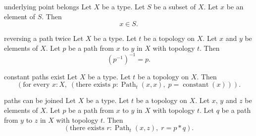 \begin{cleanresult}{underlying point belongs}
Let $X$ be a type.
Let $S$ be a subset of $X$.
Let $x$ be an element of $S$.
Then \[x\in S.\]
\par{}
\end{cleanresult}

\begin{cleanresult}{reversing a path twice}
Let $X$ be a type.
Let $t$ be a topology on $X$.
Let $x$ and $y$ be elements of $X$.
Let $p$ be a path from $x$ to $y$ in $X$ with topology $t$.
Then \[(p^{-1})^{-1}=p.\]
\par{}
\end{cleanresult}

\begin{cleanresult}{constant paths exist}
Let $X$ be a type.
Let $t$ be a topology on $X$.
Then \[\left(\text{for every }x : X,\; \left(\text{there exists }p : \operatorname{Path}_{t}(x,x),\; p=\operatorname{constant}(x)\right)\right).\]
\par{}
\end{cleanresult}

\begin{cleanresult}{paths can be joined}
Let $X$ be a type.
Let $t$ be a topology on $X$.
Let $x$, $y$ and $z$ be elements of $X$.
Let $p$ be a path from $x$ to $y$ in $X$ with topology $t$.
Let $q$ be a path from $y$ to $z$ in $X$ with topology $t$.
Then \[\left(\text{there exists }r : \operatorname{Path}_{t}(x,z),\; r=p * q\right).\]
\par{}
\end{cleanresult}

